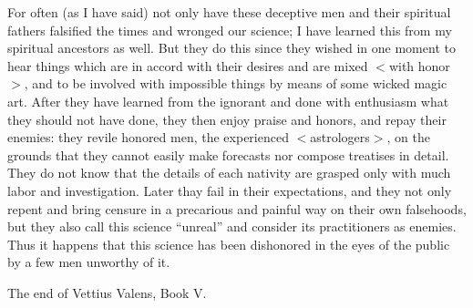 For often (as I have said) not only have these deceptive men and their spiritual fathers falsified the times and wronged our science; I have learned this from my spiritual ancestors as well. But they do this
since they wished in one moment to hear things which are in accord with their desires and are mixed $<$with honor$>$, and to be involved with impossible things by means of some wicked magic art. After they have learned from the ignorant and done with enthusiasm what they should not have done, they then enjoy praise and honors, and repay their enemies: they revile honored men, the experienced $<$astrologers$>$, on the grounds that they cannot easily make forecasts nor compose treatises in detail. They do not know that the
details of each nativity are grasped only with much labor and investigation. Later thay fail in their expectations, and they not only repent and bring censure in a precarious and painful way on their own
falsehoods, but they also call this science “unreal” and consider its practitioners as enemies. Thus it happens that this science has been dishonored in the eyes of the public by a few men unworthy of it.

The end of Vettius Valens, Book V.

\newpage